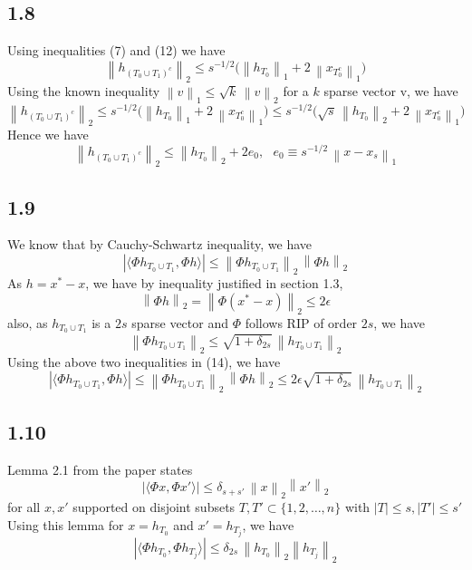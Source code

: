 \documentclass[12pt]{article}
\newcommand{\norm}[1]{\left\lVert #1 \right\rVert}
\begin{document}
\subsection*{1.8}
Using inequalities (7) and (12) we have
$$\norm{h_{(T_0 \cup T_1)^c}}_2 \leq s^{-1/2} \bigg(\norm{h_{T_0}}_1 + 2\,\norm{x_{T_0^c}}_1\bigg)$$
Using the known inequality $\norm{v}_1 \leq \sqrt{k} \, \norm{v}_2$ for a $k$ sparse vector v, we have
$$\norm{h_{(T_0 \cup T_1)^c}}_2 \leq s^{-1/2} \bigg(\norm{h_{T_0}}_1 + 2\,\norm{x_{T_0^c}}_1\bigg) \leq s^{-1/2} \bigg(\sqrt{s}\, \norm{h_{T_0}}_2 + 2\, \norm{x_{T_0^c}}_1\bigg)$$
Hence we have
\begin{equation}
	\norm{h_{(T_0 \cup T_1)^c}}_2 \leq \norm{h_{T_0}}_2 + 2e_0, \:\:\: e_0 \equiv s^{-1/2}\, \norm{x - x_s}_1
\end{equation}
\subsection*{1.9}
We know that by Cauchy-Schwartz inequality, we have
\begin{equation}
|\langle \Phi h_{T_0 \cup T_1}, \Phi h\rangle| \leq \norm{\Phi  h_{T_0 \cup T_1}}_2 \, \norm{\Phi h}_2
\end{equation}
As $h = x^* - x$, we have by inequality justified in section 1.3, 
$$\norm{\Phi h}_2 = \norm{\Phi (x^* - x)}_2 \leq 2\epsilon$$
also, as $h_{T_0 \cup T_1}$ is a $2s$ sparse vector and $\Phi$ follows RIP of order $2s$, we have
$$\norm{\Phi h_{T_0 \cup T_1}}_2 \leq \sqrt{1 + \delta_{2s}} \, \norm{ h_{T_0 \cup T_1}}_2$$
Using the above two inequalities in (14), we have
\begin{equation}
	|\langle \Phi h_{T_0 \cup T_1}, \Phi h\rangle| \leq \norm{\Phi  h_{T_0 \cup T_1}}_2 \, \norm{\Phi h}_2 \leq 	2\epsilon \sqrt{1 + \delta_{2s}} \, \norm{ h_{T_0 \cup T_1}}_2
\end{equation}
\subsection*{1.10}
Lemma 2.1 from the paper states
$$|\langle \Phi x, \Phi x' \rangle | \leq \delta_{s + s'}\, \norm{x}_2 \norm{x'}_2$$
for all $x, x'$ supported on disjoint subsets $T, T' \subset \{1, 2, \ldots, n\}$ with $|T| \leq s, |T'| \leq s'$
Using this lemma for $x = h_{T_0}$ and $x' = h_{T_j}$, we have
\begin{equation}
|\langle \Phi h_{T_0}, \Phi h_{T_j}\rangle | \leq \delta_{2s} \, \norm{h_{T_0}}_2 \norm{h_{T_j}}_2
\end{equation}
\end{document}
